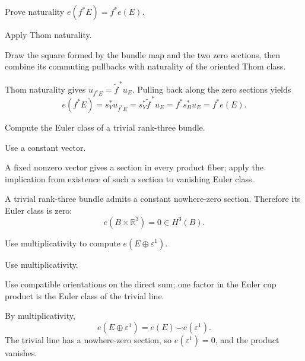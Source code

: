 \begin{exercise}\label{exr:viii32-03}
Prove naturality $e(f^*E)=f^*e(E)$.
\end{exercise}
\begin{hint}
Apply Thom naturality.

Draw the square formed by the bundle map and the two zero sections, then combine its commuting pullbacks with naturality of the oriented Thom class.
\end{hint}
\begin{solution}
Thom naturality gives \(u_{f^*E}=\widetilde f^{\,*}u_E\). Pulling back along the zero sections yields
\[
e(f^*E)=s_Y^*u_{f^*E}=s_Y^*\widetilde f^{\,*}u_E=f^*s_B^*u_E=f^*e(E).
\]
\end{solution}

\begin{exercise}\label{exr:viii32-04}
Compute the Euler class of a trivial rank-three bundle.
\end{exercise}
\begin{hint}
Use a constant vector.

A fixed nonzero vector gives a section in every product fiber; apply the implication from existence of such a section to vanishing Euler class.
\end{hint}
\begin{solution}
A trivial rank-three bundle admits a constant nowhere-zero section. Therefore its Euler class is zero:
\[
e(B\times\mathbb R^3)=0\in H^3(B).
\]
\end{solution}

\begin{exercise}\label{exr:viii32-05}
Use multiplicativity to compute $e(E\oplus\varepsilon^1)$.
\end{exercise}
\begin{hint}
Use multiplicativity.

Use compatible orientations on the direct sum; one factor in the Euler cup product is the Euler class of the trivial line.
\end{hint}
\begin{solution}
By multiplicativity,
\[
e(E\oplus\varepsilon^1)=e(E)\smile e(\varepsilon^1).
\]
The trivial line has a nowhere-zero section, so \(e(\varepsilon^1)=0\), and the product vanishes.
\end{solution}

